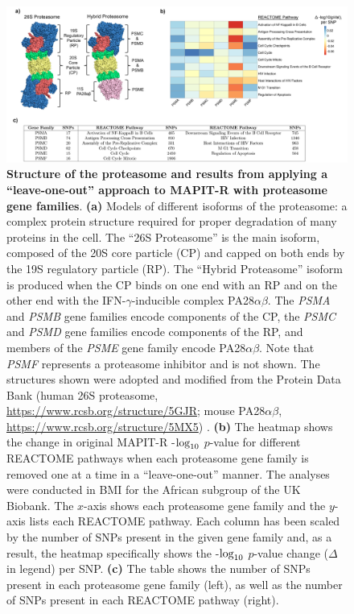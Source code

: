 \documentclass[10pt]{article}
\def\log{{\rm log}}
\begin{document}
\begin{landscape}
\begin{figure}[htbp]
\centering
\includegraphics[scale=.6]{Images/Main/Figure5.png}
\caption{\textbf{Structure of the proteasome and results from applying a ``leave-one-out'' approach to MAPIT-R with proteasome gene families}. \textbf{(a)} Models of different isoforms of the proteasome: a complex protein structure required for proper degradation of many proteins in the cell. The ``26S Proteasome'' is the main isoform, composed of the 20S core particle (CP) and capped on both ends by the 19S regulatory particle (RP). The ``Hybrid Proteasome'' isoform is produced when the CP binds on one end with an RP and on the other end with the IFN-$\gamma$-inducible complex PA28$\alpha\beta$. The \textit{PSMA} and \textit{PSMB} gene families encode components of the CP, the \textit{PSMC} and \textit{PSMD} gene families encode components of the RP, and members of the \textit{PSME} gene family encode PA28$\alpha\beta$. Note that \textit{PSMF} represents a proteasome inhibitor and is not shown. The structures shown were adopted and modified from the Protein Data Bank (human 26S proteasome, \url{https://www.rcsb.org/structure/5GJR}; mouse PA28$\alpha\beta$, \url{https://www.rcsb.org/structure/5MX5}) \cite{Murata2018}. \textbf{(b)} The heatmap shows the change in original MAPIT-R -$\log_{10}$ $p$-value for different REACTOME pathways when each proteasome gene family is removed one at a time in a ``leave-one-out'' manner. The analyses were conducted in BMI for the African subgroup of the UK Biobank. The $x$-axis shows each proteasome gene family and the $y$-axis lists each REACTOME pathway. Each column has been scaled by the number of SNPs present in the given gene family and, as a result, the heatmap specifically shows the -$\log_{10}$ $p$-value change ($\Delta$ in legend) per SNP. \textbf{(c)} The table shows the number of SNPs present in each proteasome gene family (left), as well as the number of SNPs present in each REACTOME pathway (right).}
\label{MAPITR-Main-Figure-Proteasome-Panels}
\end{figure} 
\end{landscape}


\begingroup
{}

\endgroup
\end{document}
